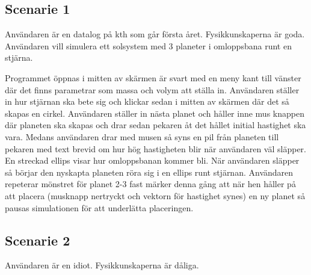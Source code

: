 \subsection{Scenarie 1}
Användaren är en datalog på kth som går första året.
Fysikkunskaperna är goda. Användaren vill simulera ett solsystem med 3 planeter i omloppsbana runt en stjärna.

Programmet öppnas i mitten av skärmen är svart med en meny kant till
vänster där det finns parametrar som massa och volym att ställa in.
Användaren ställer in hur stjärnan ska bete sig och klickar
sedan i mitten av skärmen där det så skapas en cirkel.
Användaren ställer in nästa planet och håller inne mus knappen där
planeten ska skapas och drar sedan pekaren åt det hållet initial
hastighet ska vara.
Medans användaren drar med musen så syns en pil från planeten till
pekaren med text brevid om hur hög hastigheten blir när användaren väl släpper.
En streckad ellips visar hur omloppsbanan kommer bli.
När användaren släpper så börjar den nyskapta planeten röra sig
i en ellips runt stjärnan.
Användaren repeterar mönstret för planet 2-3 fast märker denna gång
att när hen håller på att placera (musknapp nertryckt och vektorn
för hastighet synes) en ny planet så pausas simulationen för att
underlätta placeringen.


\subsection{Scenarie 2}
Användaren är en idiot.
Fysikkunskaperna är dåliga.
